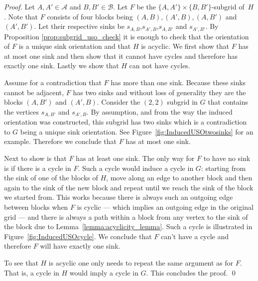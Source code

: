 \documentclass[runningheads,a4paper]{llncs}
\newcommand{\A}{\ensuremath{\mathcal A}}
\newcommand{\B}{\ensuremath{\mathcal B}}
\newcommand{\s}[1]{\ensuremath{s_{\scriptscriptstyle#1}}}
\begin{document}
\begin{proof}
Let $A, A'\in \A$ and $B,B'\in \B$. Let $F$ be the $\{A,A'\}\times\{B, B'\}$-subgrid of~$H$.
Note that $F$ consists of four blocks being $(A,B), (A', B), (A, B')$ and $(A', B')$. Let their respective sinks be $s_{A,B}$,$s_{A',B}$,$s_{A,B'}$ and $s_{A',B'}$.
By Proposition \ref{prop:subgrid_uso_check} it is enough to check that the orientation of $F$ is a unique sink orientation and that $H$ is acyclic.
We first show that $F$ has at most one sink and then show that it cannot have cycles and therefore has exactly one sink. Lastly we show that $H$ can not have cycles.

Assume for a contradiction that $F$ has more than one sink.
Because these sinks cannot be adjacent, $F$ has two sinks and without loss of generality they are the blocks $(A,B')$ and $(A', B)$. Consider the $(2,2)$ subgrid in $G$ that contains the vertices $\s{A,B'}$ and $\s{A',B}$. By assumption, and from the way the induced orientation was constructed, this subgrid has two sinks which is a contradiction to $G$ being a unique sink orientation. See Figure~\ref{fig:InducedUSOtwosinks} for an example. Therefore we conclude that $F$ has at most one sink. 

Next to show is that $F$ has at least one sink. The only way for $F$ to have no sink is if there is a cycle in $F$. Such a cycle would induce a cycle in $G$: starting from the sink of one of the blocks of $H$, move along an edge to another block and then again to the sink of the new block and repeat until we reach the sink of the block we started from. This works because there is always such an outgoing edge between blocks when $F$ is cyclic --- which implies an outgoing edge in the original grid --- and there is always a path within a block from any vertex to the sink of the block due to Lemma~\ref{lemma:acyclicity_lemma}. Such a cycle is illustrated in Figure~\ref{fig:InducedUSOcycle}. We conclude that $F$ can't have a cycle and therefore $F$ will have exactly one sink.

To see that $H$ is acyclic one only needs to repeat the same argument as for $F$. That is, a cycle in $H$ would imply a cycle in $G$. This concludes the proof. \qed


\end{proof}
\end{document}
